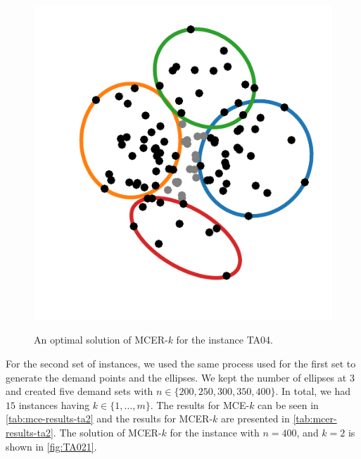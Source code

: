 \begin{figure}[H]
	\centering
	\caption{An optimal solution of MCER-$k$ for the instance TA04.}
	\includegraphics[scale=.8]{tex/figures/TA004}
	\fautor
	\label{fig:TA004}
\end{figure}

For the second set of instances, we used the same process used for the first set to generate the demand points and the ellipses. We kept the number of ellipses at $3$ and created five demand sets with $n\in\{200, 250, 300, 350, 400\}$. In total, we had $15$ instances having $k\in\{1, \dots, m\}$. The results for MCE-$k$ can be seen in \autoref{tab:mce-results-ta2} and the results for MCER-$k$ are presented in \autoref{tab:mcer-results-ta2}. The solution of MCER-$k$ for the instance with $n=400$, and $k=2$ is shown in \autoref{fig:TA021}.

